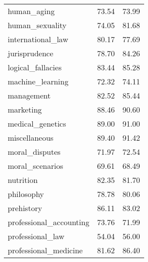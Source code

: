 \begin{table}[t]
\begin{tabular}{L{0.35}C{0.20}C{0.20}}
        human\_aging                            & 73.54                    & 73.99                      \\
        human\_sexuality                        & 74.05                    & 81.68                      \\
        international\_law                      & 80.17                    & 77.69                      \\
        jurisprudence                           & 78.70                    & 84.26                      \\
        logical\_fallacies                      & 83.44                    & 85.28                      \\
        machine\_learning                       & 72.32                    & 74.11                      \\
        management                              & 82.52                    & 85.44                      \\
        marketing                               & 88.46                    & 90.60                      \\
        medical\_genetics                       & 89.00                    & 91.00                      \\
        miscellaneous                           & 89.40                    & 91.42                      \\
        moral\_disputes                         & 71.97                    & 72.54                      \\
        moral\_scenarios                        & 69.61                    & 68.49                      \\
        nutrition                               & 82.35                    & 81.70                      \\
        philosophy                              & 78.78                    & 80.06                      \\
        prehistory                              & 86.11                    & 83.02                      \\
        professional\_accounting                & 73.76                    & 71.99                      \\
        professional\_law                       & 54.04                    & 56.00                      \\
        professional\_medicine                  & 81.62                    & 86.40                      \\

\end{tabular}
\end{table}

